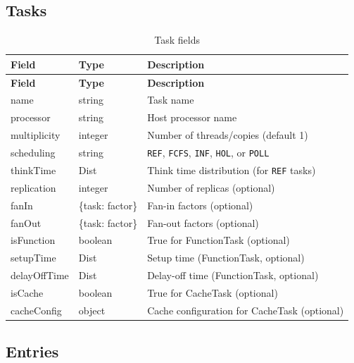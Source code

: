\subsection{Tasks}
\label{json:lqn-task}

\begin{footnotesize}
\begin{longtable}{|T{2.2cm}|T{2.5cm}|D{8.2cm}|}
\caption{Task fields}\label{tab:json-task}
\\\hline
\textbf{Field} & \textbf{Type} & \textbf{Description} \\\hline
\endfirsthead
\hline \textbf{Field} & \textbf{Type} & \textbf{Description} \\\hline
\endhead
\hline
\endfoot
name         & string  & Task name \\\hline
processor    & string  & Host processor name \\\hline
multiplicity & integer & Number of threads/copies (default 1) \\\hline
scheduling   & string  & \texttt{REF}, \texttt{FCFS}, \texttt{INF}, \texttt{HOL}, or \texttt{POLL} \\\hline
thinkTime    & Dist    & Think time distribution (for \texttt{REF} tasks) \\\hline
replication  & integer & Number of replicas (optional) \\\hline
fanIn        & \{task: factor\} & Fan-in factors (optional) \\\hline
fanOut       & \{task: factor\} & Fan-out factors (optional) \\\hline
isFunction   & boolean & True for FunctionTask (optional) \\\hline
setupTime    & Dist    & Setup time (FunctionTask, optional) \\\hline
delayOffTime & Dist    & Delay-off time (FunctionTask, optional) \\\hline
isCache      & boolean & True for CacheTask (optional) \\\hline
cacheConfig  & object  & Cache configuration for CacheTask (optional) \\\hline
\end{longtable}
\end{footnotesize}

\subsection{Entries}
\label{json:lqn-entry}

